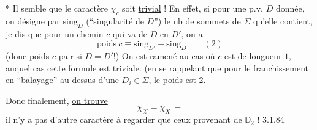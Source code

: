$*$ Il semble que le caractère $\chi_c$ soit \uline{trivial} ! En effet, si pour une p.v. $D$ donnée, on désigne par $\mathrm{sing}_D$ (``singularité de $D$'') le nb de sommets de $\Sigma$ qu'elle contient, je dis que pour un chemin $c$ qui va de $D$ en $D'$, on a
\[
\mathrm{poids}\ c\equiv\mathrm{sing}_{D'}-\mathrm{sing}_D\qquad(2)
\]
(donc poids $c$ \uline{pair} si $D=D'$!) On est ramené au cas où $c$ est de longueur $1$, auquel cas cette formule est triviale. (en se rappelant que pour le franchissement  en ``balayage'' au dessus d'une  $D_i\in\Sigma$, le poids est 2.

Donc finalement, \uline{on trouve}
\[
\boxed{\chi_{\mathscr X}=\chi_X\ -}
\]
il n'y a pas d'autre caractère à regarder que ceux provenant de $\mathbb D_2$ !
3.1.84


